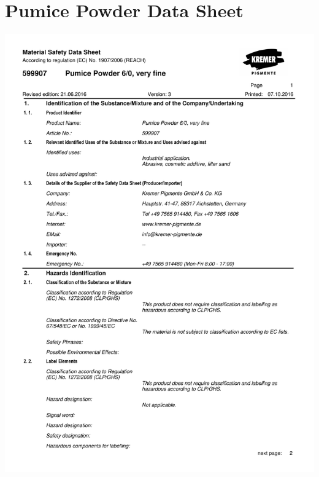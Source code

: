 \chapter{Pumice Powder Data Sheet}
\label{App:pumice}
\newpage
\centering
\includegraphics[page=1,scale=0.75]{powdered_pumice_very_fine_datasheet.pdf}
